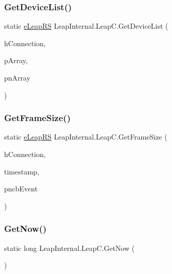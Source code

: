 \subsubsection{\texorpdfstring{GetDeviceList()}{GetDeviceList()}}
{\footnotesize\ttfamily static \mbox{\hyperlink{namespace_leap_internal_ae50b07d24c508b84273392b6dcbea1d9}{e\+Leap\+RS}} Leap\+Internal.\+Leap\+C.\+Get\+Device\+List (\begin{DoxyParamCaption}\item[{Int\+Ptr}]{h\+Connection,  }\item[{\mbox{[}\+In, Out\mbox{]} \mbox{\hyperlink{struct_leap_internal_1_1_l_e_a_p___d_e_v_i_c_e___r_e_f}{L\+E\+A\+P\+\_\+\+D\+E\+V\+I\+C\+E\+\_\+\+R\+EF}} \mbox{[}$\,$\mbox{]}}]{p\+Array,  }\item[{out U\+Int32}]{pn\+Array }\end{DoxyParamCaption})}

\mbox{\label{class_leap_internal_1_1_leap_c_af4b7756a3307a082b6160d6e06d7f187}} 
\subsubsection{\texorpdfstring{GetFrameSize()}{GetFrameSize()}}
{\footnotesize\ttfamily static \mbox{\hyperlink{namespace_leap_internal_ae50b07d24c508b84273392b6dcbea1d9}{e\+Leap\+RS}} Leap\+Internal.\+Leap\+C.\+Get\+Frame\+Size (\begin{DoxyParamCaption}\item[{Int\+Ptr}]{h\+Connection,  }\item[{Int64}]{timestamp,  }\item[{out U\+Int64}]{pncb\+Event }\end{DoxyParamCaption})}

\mbox{\label{class_leap_internal_1_1_leap_c_a92e9bb730041df4094e328bcf326da47}} 
\subsubsection{\texorpdfstring{GetNow()}{GetNow()}}
{\footnotesize\ttfamily static long Leap\+Internal.\+Leap\+C.\+Get\+Now (\begin{DoxyParamCaption}{ }\end{DoxyParamCaption})}

